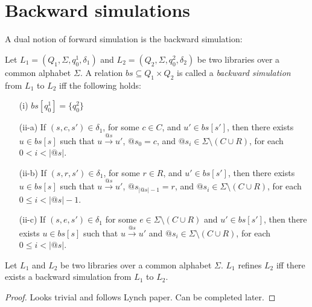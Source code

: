 \section{Backward simulations}\label{app:backSim}

A dual notion of forward simulation is the backward simulation:
\begin{dfn}
Let $L_1=(Q_1,\Sigma, q_0^1, \delta_1)$ and $L_2=(Q_2,\Sigma, q_0^2, \delta_2)$ be two libraries over a common alphabet $\Sigma$. A relation $bs \subseteq Q_1 \times Q_2$ is called a \emph{backward simulation} from $L_1$ to $L_2$ iff the following holds:
\begin{itemize}
\item[(i)] $bs[q_0^1] = \{q_0^2 \}$
\item[(ii-a)] If $(s,c,s') \in \delta_1$, for some $c\in C$, and $u' \in bs[s']$, then there exists $u \in bs[s]$ such that $u \xrightarrow{@s} u'$, $@s_0=c$, and $@s_i\in \Sigma\setminus(C\cup R)$, for each $0<i<|@s|$.
\item[(ii-b)] If $(s,r,s') \in \delta_1$, for some $r\in R$, and $u' \in bs[s']$, then there exists $u \in bs[s]$ such that $u \xrightarrow{@s} u'$, $@s_{|@s| -1}=r$, and $@s_i\in \Sigma\setminus(C\cup R)$, for each $0\leq i<|@s| -1$.
\item[(ii-c)] If $(s,e,s') \in \delta_1$ for some $e \in \Sigma\setminus (C\cup R)$ and $u' \in bs[s']$, then there exists $u \in bs[s]$ such that $u \xrightarrow{@s} u'$ and $@s_i\in \Sigma\setminus(C\cup R)$, for each $0\leq i<|@s|$.
\end{itemize}
\end{dfn}

\begin{lem}
Let $L_1$ and $L_2$ be two libraries over a common alphabet $\Sigma$. $L_1$ refines $L_2$ if{f} there exists a backward simulation from $L_1$ to $L_2$.
\end{lem}
\begin{proof}
Looks trivial and follows Lynch paper. Can be completed later.
\end{proof}
